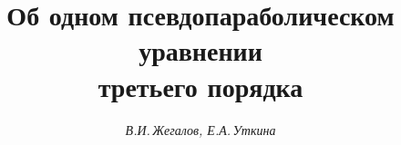 

 


%  


 


\newcommand{\const}{\operatorname{const}} 


\newcommand{\tts}[1]{} 


 




\setcounter{page}{73} 












 


\author{\it В.И.\,Жегалов, Е.А.\,Уткина} 




\title{Об одном псевдопараболическом уравнении\\ третьего порядка} 


 


\date{} 




\pagestyle{plain} %


 




\maketitle 


